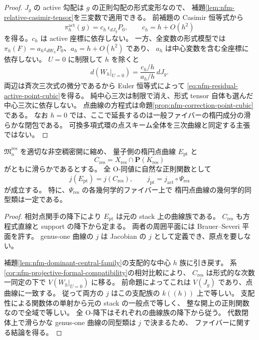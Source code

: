 \begin{proof}
$J_g$ の active 勾配は $g$ の正則勾配の形式変形なので、
補題\ref{lem:nfm-relative-casimir-tensor}を三変数で適用できる。
前補題の Casimir 恒等式から
\[
 \pi_h^{\mathrm{act}}(g)=c_h\,\iota_{dJ_g}P_0,
 \qquad c_h=h+O(h^2)
\]
を得る。$c_h$ は active 座標に依存しない。
一方、全変数の形式模型では
$\pi_h(F)=a_h\iota_{dW_h}P_0$、$a_h=h+O(h^2)$ であり、
$a_h$ は中心変数を含む全座標に依存しない。
$U=0$ に制限して $h$ を除くと
\[
 d(W_h|_{U=0})
 =\frac{c_h/h}{a_h/h}\,dJ_g.
\]
両辺は斉次三次式の微分であるから Euler 恒等式によって
\eqref{eq:nfm-residual-active-point-cubic}を得る。
純中心三次は制限で消え、形式 tensor 自体も選んだ中心三次に依存しない。
点曲線の方程式は命題\ref{prop:nfm-correction-point-cubic}である。
なお $h=0$ では、ここで延長するのは一般ファイバーの楕円成分の滑らかな閉包である。
可換多項式環の点スキーム全体を三次曲線と同定する主張ではない。
\end{proof}

\begin{theorem}
\label{thm:nfm-residual-point-j}
$\mathfrak M_n^{\mathrm{res}}$ を適切な非空稠密開に縮め、
量子側の楕円点曲線 $E_{\mathrm{pt}}$ と
\[
 C_{\mathrm{res}}=X_{\mathrm{res}}\cap\mathbf P(K_{\mathrm{res}})
\]
がともに滑らかであるとする。
全 O-同値に自然な正則関数として
\begin{equation}\label{eq:nfm-residual-point-j}
 j(E_{\mathrm{pt}})=j(C_{\mathrm{res}}),\qquad
 j_{\mathrm{pt}}=j_{\mathrm{act}}\circ\Psi_{\mathrm{res}}
\end{equation}
が成立する。
特に、$\Psi_{\mathrm{res}}$ の各幾何学的ファイバー上で
楕円点曲線の幾何学的同型類は一定である。
\end{theorem}

\begin{proof}
相対点関手の降下により $E_{\mathrm{pt}}$ は元の stack 上の曲線族である。
$C_{\mathrm{res}}$ も方程式直線と support の降下から定まる。
両者の周囲平面には Brauer--Severi 平面を許す。
genus-one 曲線の $j$ は Jacobian の $j$ として定義でき、原点を要しない。

補題\ref{lem:nfm-dominant-central-family}の支配的な中心 $h$ 族に引き戻す。
系\ref{cor:nfm-projective-formal-compatibility}の相対比較により、
$C_{\mathrm{res}}$ は形式的な次数一同定の下で
$V(W_h|_{U=0})$ に移る。
前命題によってこれは $V(J_g)$ であり、点曲線に一致する。
従って両方の $j$ はこの支配族の $k((h))$ 上で等しい。
支配性による関数体の単射から元の stack の一般点で等しく、
整な開上の正則関数なので全域で等しい。
全 O-降下はそれぞれの曲線族の降下から従う。
代数閉体上で滑らかな genus-one 曲線の同型類は $j$ で決まるため、
ファイバーに関する結論を得る。
\end{proof}

